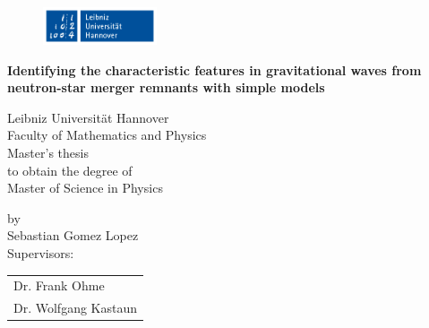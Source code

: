 \begin{titlepage}

\begin{figure}[h]
\includegraphics[width=0.3\textwidth, angle=0]{images/u_logo.png}
\end{figure}


\begin{center}
       \vspace*{1cm}

       \textbf{\Large Identifying the characteristic features in gravitational waves from neutron-star merger remnants with simple models}

       \vspace{1cm}
        \large Leibniz Universität Hannover\\
        \large Faculty of Mathematics and Physics\\
        
        
   	   \vspace*{3cm}
   	   Master's thesis\\
   	   \vspace*{1cm}
   	   to obtain the degree of\\
   	   Master of Science in Physics
   	   
   	   \vspace*{2cm}
   	   by\\
   	   \vspace*{1cm}
   	   Sebastian Gomez Lopez\\
   	   
   	   \vspace*{2cm}
   	   Supervisors: \begin{tabular}{l}
   	   				Dr. Frank Ohme\\
   	   				Dr. Wolfgang Kastaun
   	   				\end{tabular}
   	   
   	   
   	   
\begin{figure}[b]


\end{figure}
\end{center}
\end{titlepage}
